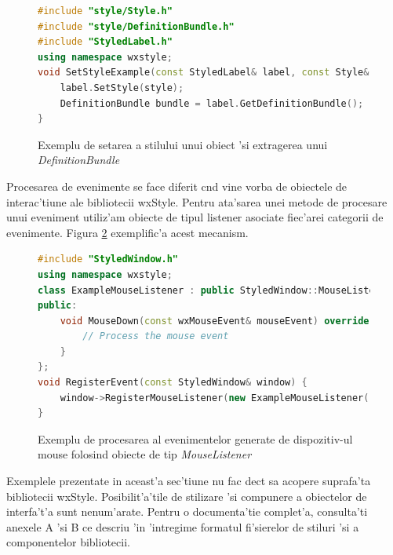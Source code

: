 \begin{figure}[H]
\begin{lstlisting}[language=C++]
#include "style/Style.h"
#include "style/DefinitionBundle.h"
#include "StyledLabel.h"
using namespace wxstyle;
void SetStyleExample(const StyledLabel& label, const Style& style) {
	label.SetStyle(style);
	DefinitionBundle bundle = label.GetDefinitionBundle();
}
\end{lstlisting}
\caption{Exemplu de setarea a stilului unui obiect 'si extragerea unui \emph{DefinitionBundle}}
\label{ex06}
\end{figure}

Procesarea de evenimente se face diferit c{\ia}nd vine vorba de obiectele de interac'tiune ale bibliotecii wxStyle. Pentru ata'sarea unei metode de procesare unui eveniment utiliz'am obiecte de tipul listener asociate fiec'arei categorii de evenimente. Figura \ref{ex07} exemplific'a acest mecanism.

\begin{figure}[H]
\begin{lstlisting}[language=C++]
#include "StyledWindow.h"
using namespace wxstyle;
class ExampleMouseListener : public StyledWindow::MouseListener {
public:
	void MouseDown(const wxMouseEvent& mouseEvent) override {
		// Process the mouse event
	}
};
void RegisterEvent(const StyledWindow& window) {
	window->RegisterMouseListener(new ExampleMouseListener());
}
\end{lstlisting}
\caption{Exemplu de procesarea al evenimentelor generate de dispozitiv-ul mouse folosind obiecte de tip \emph{MouseListener}}
\label{ex07}
\end{figure}

Exemplele prezentate in aceast'a sec'tiune nu fac dec{\ia}t sa acopere suprafa'ta bibliotecii wxStyle. Posibilit'a'tile de stilizare 'si compunere a obiectelor de interfa't'a sunt nenum'arate. Pentru o documenta'tie complet'a, consulta'ti anexele A 'si B ce descriu 'in 'intregime formatul fi'sierelor de stiluri 'si a componentelor bibliotecii.